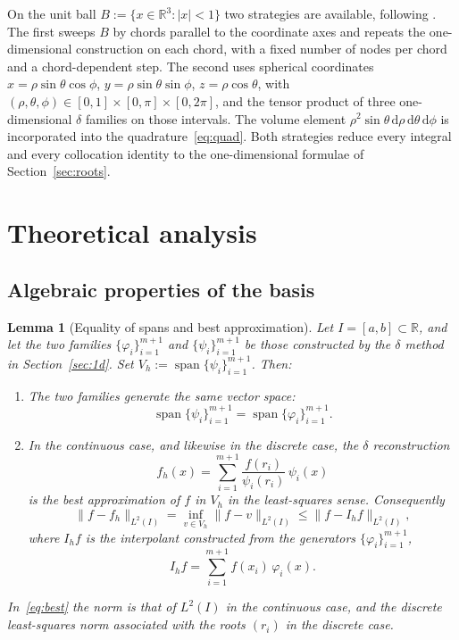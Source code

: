 \documentclass[final,3p,times]{elsarticle}
\theoremstyle{plain}
\newtheorem{lemma}[theorem]{Lemma}
\theoremstyle{definition}
\theoremstyle{remark}
\newcommand{\dziti}{\ensuremath{\delta}\text{-Ziti}}
\newcommand{\spanop}{\operatorname{span}}
\newcommand{\dd}{\mathrm{d}}
\begin{document}
On the unit ball $B:=\{x\in\mathbb{R}^3:\lvert x\rvert<1\}$ two strategies
are available, following \cite{Malek2021}. The first sweeps $B$ by chords
parallel to the coordinate axes and repeats the one-dimensional construction
on each chord, with a fixed number of nodes per chord and a chord-dependent
step. The second uses spherical coordinates
$x=\rho\sin\theta\cos\phi$, $y=\rho\sin\theta\sin\phi$,
$z=\rho\cos\theta$, with
$(\rho,\theta,\phi)\in[0,1]\times[0,\pi]\times[0,2\pi]$, and the tensor
product of three one-dimensional \dziti{} families on those intervals. The
volume element $\rho^2\sin\theta\,\dd\rho\,\dd\theta\,\dd\phi$ is
incorporated into the quadrature~\eqref{eq:quad}. Both strategies reduce
every integral and every collocation identity to the one-dimensional
formulae of Section~\ref{sec:roots}.

\section{Theoretical analysis}
\label{sec:theory}

\subsection{Algebraic properties of the basis}

\begin{lemma}[Equality of spans and best approximation]
\label{lem:orthonormal}
Let $I=[a,b]\subset\mathbb{R}$, and let the two families
$\{\varphi_i\}_{i=1}^{m+1}$ and $\{\psi_i\}_{i=1}^{m+1}$ be those constructed
by the \dziti{} method in Section~\ref{sec:1d}. Set
$V_h:=\spanop\{\psi_i\}_{i=1}^{m+1}$. Then:
\begin{enumerate}
\item The two families generate the same vector space:
\begin{equation}
\label{eq:spans}
\spanop\{\psi_i\}_{i=1}^{m+1}
=
\spanop\{\varphi_i\}_{i=1}^{m+1}.
\end{equation}
\item In the continuous case, and likewise in the discrete case, the
\dziti{} reconstruction
\begin{equation}
\label{eq:fh}
f_h(x)
=\sum_{i=1}^{m+1}\frac{f(r_i)}{\psi_i(r_i)}\,\psi_i(x)
\end{equation}
is the best approximation of $f$ in $V_h$ in the least-squares sense. Consequently
\begin{equation}
\label{eq:best}
\lVert f-f_h\rVert_{L^2(I)}
=\inf_{v\in V_h}\lVert f-v\rVert_{L^2(I)}
\le
\lVert f-I_h f\rVert_{L^2(I)},
\end{equation}
where $I_h f$ is the interpolant constructed from the generators
$\{\varphi_i\}_{i=1}^{m+1}$,
\begin{equation}
\label{interp}
I_h f=\sum_{i=1}^{m+1}f(x_i)\,\varphi_i(x).
\end{equation}
\end{enumerate}
In~\eqref{eq:best} the norm is that of $L^2(I)$ in the continuous case, and
the discrete least-squares norm associated with the roots $(r_i)$ in the
discrete case.
\end{lemma}
\end{document}
